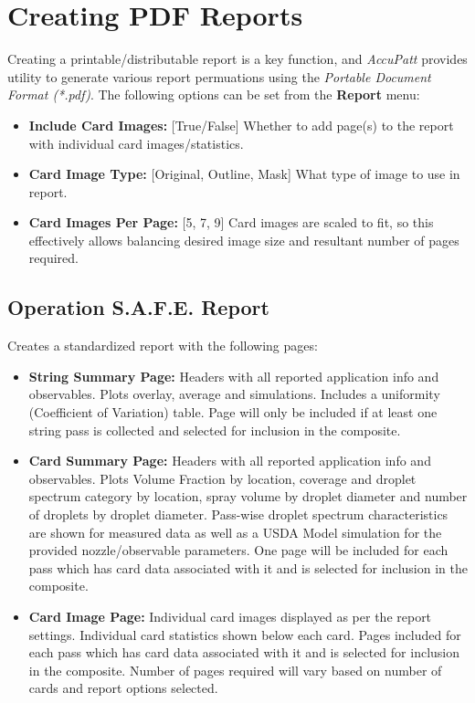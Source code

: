 \documentclass[10pt,letterpaper,titlepage]{article}
\begin{document}
    \section{Creating PDF Reports}
    Creating a printable/distributable report is a key function, and \textit{AccuPatt} provides utility to generate various report permuations using the \textit{Portable Document Format (*.pdf)}. The following options can be set from the \textbf{Report} menu:
    \begin{itemize}
        \item \textbf{Include Card Images:} [True/False] Whether to add page(s) to the report with individual card images/statistics.
        \item \textbf{Card Image Type:} [Original, Outline, Mask] What type of image to use in report.
        \item \textbf{Card Images Per Page:} [5, 7, 9] Card images are scaled to fit, so this effectively allows balancing desired image size and resultant number of pages required.
    \end{itemize}

    \subsection{Operation S.A.F.E. Report}
    Creates a standardized report with the following pages:
    \begin{itemize}
        \item \textbf{String Summary Page:} Headers with all reported application info and observables. Plots overlay, average and simulations. Includes a uniformity (Coefficient of Variation) table. Page will only be included if at least one string pass is collected and selected for inclusion in the composite.
        \item \textbf{Card Summary Page:} Headers with all reported application info and observables. Plots Volume Fraction by location, coverage and droplet spectrum category by location, spray volume by droplet diameter and number of droplets by droplet diameter. Pass-wise droplet spectrum characteristics are shown for measured data as well as a USDA Model simulation for the provided nozzle/observable parameters. One page will be included for each pass which has card data associated with it and is selected for inclusion in the composite.
        \item \textbf{Card Image Page:} Individual card images displayed as per the report settings. Individual card statistics shown below each card. Pages included for each pass which has card data associated with it and is selected for inclusion in the composite. Number of pages required will vary based on number of cards and report options selected.
    \end{itemize}
    \newpage
\end{document}
